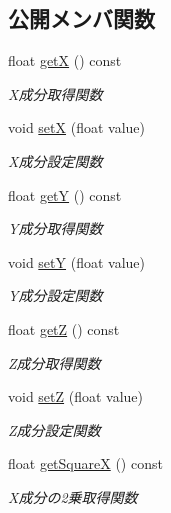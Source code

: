 \subsection*{公開メンバ関数}
\begin{DoxyCompactItemize}
\item 
float \mbox{\hyperlink{class_vector3_d_a1c2679622aef3b49ed30857ca3eda472}{getX}} () const
\begin{DoxyCompactList}\small\item\em X成分取得関数 \end{DoxyCompactList}\item 
void \mbox{\hyperlink{class_vector3_d_a1d0270486894c651e920dfa62dc9259a}{setX}} (float value)
\begin{DoxyCompactList}\small\item\em X成分設定関数 \end{DoxyCompactList}\item 
float \mbox{\hyperlink{class_vector3_d_a1568588ea6695cb2a5680b156f45f961}{getY}} () const
\begin{DoxyCompactList}\small\item\em Y成分取得関数 \end{DoxyCompactList}\item 
void \mbox{\hyperlink{class_vector3_d_a94311183867a11fc8b7c6fc6a1d100a9}{setY}} (float value)
\begin{DoxyCompactList}\small\item\em Y成分設定関数 \end{DoxyCompactList}\item 
float \mbox{\hyperlink{class_vector3_d_ab5f2c9a3a82269a8797d2fea70602ede}{getZ}} () const
\begin{DoxyCompactList}\small\item\em Z成分取得関数 \end{DoxyCompactList}\item 
void \mbox{\hyperlink{class_vector3_d_a33803684829d7be6b3fb746e4b530feb}{setZ}} (float value)
\begin{DoxyCompactList}\small\item\em Z成分設定関数 \end{DoxyCompactList}\item 
float \mbox{\hyperlink{class_vector3_d_a36067a5027567b47c11eae8f1fc5be82}{get\+SquareX}} () const
\begin{DoxyCompactList}\small\item\em X成分の2乗取得関数 \end{DoxyCompactList}\item 

\end{DoxyCompactItemize}
